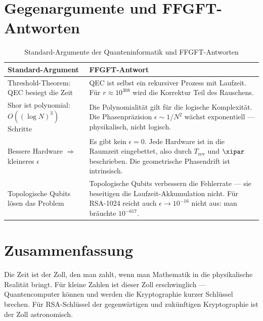 \section{Gegenargumente und FFGFT-Antworten}

\begin{table}[ht]
\centering
\begin{tabular}{|p{5cm}|p{7.5cm}|}
\hline
\textbf{Standard-Argument} & \textbf{FFGFT-Antwort} \\
\hline
Threshold-Theorem: QEC besiegt die Zeit & QEC ist selbst ein rekursiver Prozess
mit Laufzeit. Für $r \approx 10^{308}$ wird die Korrektur Teil des Rauschens. \\
\hline
Shor ist polynomial: $O((\log N)^3)$ Schritte & Die Polynomialität gilt für
die logische Komplexität. Die Phasenpräzision $\epsilon \sim 1/N^2$ wächst
exponentiell — physikalisch, nicht logisch. \\
\hline
Bessere Hardware $\Rightarrow$ kleineres $\epsilon$ & Es gibt kein $\epsilon = 0$.
Jede Hardware ist in die Raumzeit eingebettet, also durch $T_\text{rev}$ und
$\xipar$ beschrieben. Die geometrische Phasendrift ist intrinsisch. \\
\hline
Topologische Qubits lösen das Problem & Topologische Qubits verbessern
die Fehlerrate — sie beseitigen die Laufzeit-Akkumulation nicht. Für RSA-1024
reicht auch $\epsilon \to 10^{-16}$ nicht aus: man bräuchte $10^{-617}$. \\
\hline
\end{tabular}
\caption{Standard-Argumente der Quanteninformatik und FFGFT-Antworten}
\end{table}


\section{Zusammenfassung}

Die Zeit ist der Zoll, den man zahlt, wenn man Mathematik in die physikalische
Realität bringt. Für kleine Zahlen ist dieser Zoll erschwinglich — Quantencomputer
können und werden die Kryptographie kurzer Schlüssel brechen. Für RSA-Schlüssel
der gegenwärtigen und zukünftigen Kryptographie ist der Zoll astronomisch.

